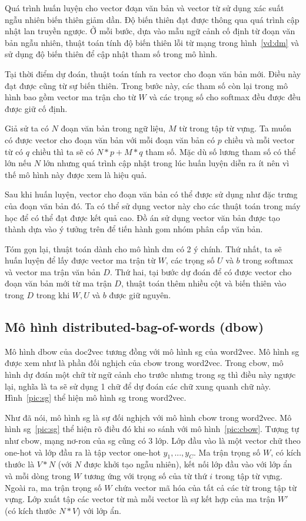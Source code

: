 Quá trình huấn luyện cho vector đơạn văn bản và vector từ sử dụng xác suất ngẫu nhiên biến thiên giảm dần.
Độ biến thiên đạt được thông qua quá trình cập nhật lan truyền ngược.
Ở mỗi bước, dựa vào mẫu ngữ cảnh cố định từ đoạn văn bản ngẫu nhiên, thuật toán tính độ biến thiên lỗi từ mạng trong hình~\ref{vd:dm} và sử dụng độ biến thiên để cập nhật tham số trong mô hình.

Tại thời điểm dự đoán, thuật toán tính ra vector cho đoạn văn bản mới.
Điều này đạt được cũng từ sự biến thiên.
Trong bước này, các tham số còn lại trong mô hình bao gồm vector ma trận cho từ $W$ và các trọng số cho softmax đều được đều được giữ cố định.

Giả sử ta có $N$ đoạn văn bản trong ngữ liệu, $M$ từ trong tập từ vựng.
Ta muốn có được vector cho đoạn văn bản với mỗi đoạn văn bản có $p$ chiều và mỗi vector từ có $q$ chiều thì ta sẽ có $N * p + M * q$ tham số.
Mặc dù số lương tham số có thể lớn nếu $N$ lớn nhưng quá trình cập nhật trong lúc huấn luyện diễn ra ít nên vì thế mô hình này được xem là hiệu quả.

Sau khi huấn luyện, vector cho đoạn văn bản có thể được sử dụng như đặc trưng của đoạn văn bản đó.
Ta có thể sử dụng vector này cho các thuật toán trong máy học để có thể đạt được kết quả cao.
Đồ án sử dụng vector văn bản được tạo thành dựa vào ý tưởng trên để tiến hành gom nhóm phân cấp văn bản.

Tóm gọn lại, thuật toán dành cho mô hình dm có 2 ý chính.
Thứ nhất, ta sẽ huấn luyện để lấy được vector ma trận từ $W$, các trọng số $U$ và $b$ trong softmax và vector ma trận văn bản $D$.
Thứ hai, tại bước dự đoán để có được vector cho đoạn văn bản mới từ ma trận $D$, thuật toán thêm nhiều cột và biến thiên vào trong $D$ trong khi $W, U$ và $b$ được giữ nguyên.

\subsection{Mô hình distributed-bag-of-words (dbow)}
Mô hình dbow của doc2vec tương đồng với mô hình sg của word2vec.
Mô hình sg được xem như là phần đối nghịch của cbow trong word2vec.
Trong cbow, mô hình dự đơán một chữ từ ngữ cảnh cho trước nhưng trong sg thì điều này ngược lại, nghĩa là ta sẽ sử dụng 1 chữ để dự đoán các chữ xung quanh chữ này.
Hình~\ref{pic:sg} thể hiện mô hình sg trong word2vec.

Như đã nói, mô hình sg là sự đối nghịch với mô hình cbow trong word2vec.
Mô hình sg~\ref{pic:sg} thể hiện rõ điều đó khi so sánh với mô hình~\ref{pic:cbow}.
Tượng tự như cbow, mạng nơ-ron của sg cũng có 3 lớp.
Lớp đầu vào là một vector chữ theo one-hot và lớp đầu ra là tập vector one-hot $y_1, ..., y_C$.
Ma trận trọng số $W$, có kích thước là $V * N$ (với $N$ được khởi tạo ngẫu nhiên), kết nối lớp đầu vào với lớp ẩn và mỗi dòng trong $W$ tương ứng với trọng số của từ thứ $i$ trong tập từ vựng.
Ngoài ra, ma trận trọng số $W$ chứa vector mã hóa của tất cả các từ trong tập từ vựng.
Lớp xuất tập các vector từ mà mỗi vector là sự kết hợp của ma trận $W'$ (có kích thước $N * V$) với lớp ẩn.

